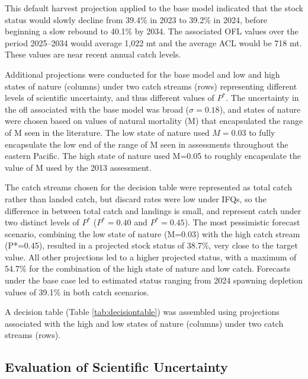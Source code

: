 \documentclass[11pt,
  english,
  letterpaper,
]{article}
\begin{document}
This default harvest projection applied to the base model indicated that the stock status would slowly decline from 39.4\% in 2023 to 39.2\% in 2024, before beginning a slow rebound to 40.1\% by 2034. The associated OFL values over the period 2025--2034 would average 1,022 mt and the average ACL would be 718 mt. These values are near recent annual catch levels.

Additional projections were conducted for the base model and low and high states of nature (columns) under two catch streams (rows) representing different levels of scientific uncertainty, and thus different values of \(P^*\). The uncertainty in the \gls{ofl} associated with the base model was broad (\(\sigma = 0.18\)), and states of nature were chosen based on values of natural mortality (M) that encapsulated the range of M seen in the literature. The low state of nature used \(M=0.03\) to fully encapsulate the low end of the range of M seen in assessments throughout the eastern Pacific. The high state of nature used M=0.05 to roughly encapsulate the value of M used by the 2013 assessment.

The catch streams chosen for the decision table were represented as total catch rather than landed catch, but discard rates were low under IFQs, so the difference in between total catch and landings is small, and represent catch under two distinct levels of \(P^*\) (\(P^*=0.40\) and \(P^*=0.45\)). The most pessimistic forecast scenario, combining the low state of nature (M=0.03) with the high catch stream (P*=0.45), resulted in a projected stock status of 38.7\%, very close to the target value. All other projections led to a higher projected status, with a maximum of 54.7\% for the combination of the high state of nature and low catch. Forecasts under the base case led to estimated status ranging from 2024 spawning depletion values of 39.1\% in both catch scenarios.

A decision table (Table \ref{tab:decisiontable}) was assembled using projections associated with the high and low states of nature (columns) under two catch streams (rows).

\hypertarget{evaluation-of-scientific-uncertainty}{%
\subsection{Evaluation of Scientific Uncertainty}\label{evaluation-of-scientific-uncertainty}}
\end{document}
